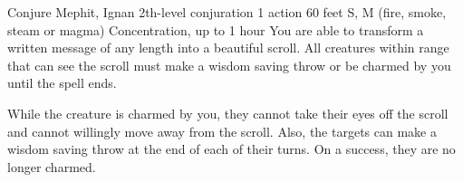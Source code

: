 \documentclass{article}
\begin{document}

\DndSpellHeader%
  {Conjure Mephit, Ignan}
  {2th-level conjuration}
  {1 action}
  {60 feet}
  {S, M (fire, smoke, steam or magma)}
  {Concentration, up to 1 hour}
You are able to transform a written message of any length into a beautiful scroll. All creatures within range that can see the scroll must make a wisdom saving throw or be charmed by you until the spell ends.

While the creature is charmed by you, they cannot take their eyes off the scroll and cannot willingly move away from the scroll. Also, the targets can make a wisdom saving throw at the end of each of their turns. On a success, they are no longer charmed.
\end{document}
